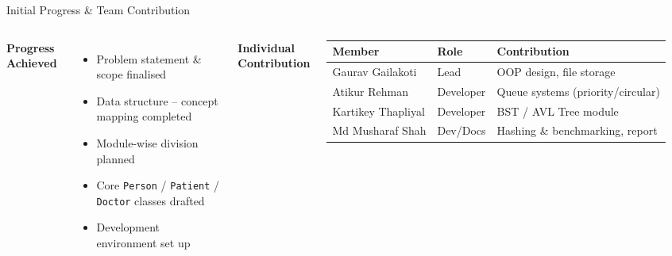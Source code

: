 \documentclass[aspectratio=169,11pt]{beamer}
\begin{document}
\begin{frame}{Initial Progress \& Team Contribution}
\begin{columns}[T,totalwidth=\textwidth]
\textbf{\color{GEUBlue}Progress Achieved}
\begin{itemize}\itemsep3pt
\item Problem statement \& scope finalised
\item Data structure -- concept mapping completed
\item Module-wise division planned
\item Core \texttt{Person} / \texttt{Patient} / \texttt{Doctor} classes drafted
\item Development environment set up
\end{itemize}
\textbf{\color{GEUBlue}Individual Contribution}
\vspace{2mm}
\scriptsize
\begin{tabularx}{\textwidth}{@{}p{2.4cm}p{2.0cm}X@{}}
\toprule
Member & Role & Contribution\\
\midrule
Gaurav Gailakoti & Lead & OOP design, file storage\\
Atikur Rehman & Developer & Queue systems (priority/circular)\\
Kartikey Thapliyal & Developer & BST / AVL Tree module\\
Md Musharaf Shah & Dev/Docs & Hashing \& benchmarking, report\\
\bottomrule
\end{tabularx}
\end{columns}
\end{frame}
\end{document}
